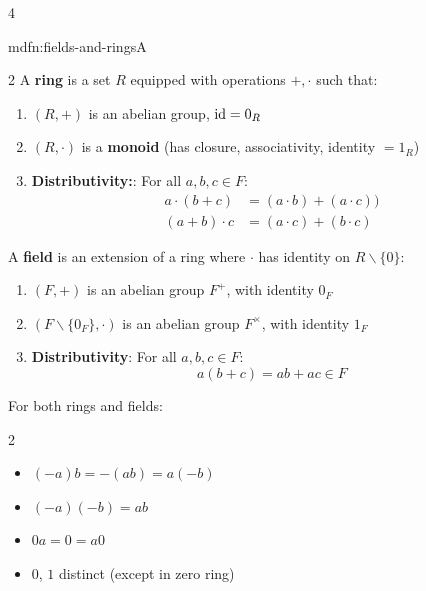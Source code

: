 \documentclass[landscape, 8pt]{extarticle}
\begin{document}
\begin{multicols*}{4}
\begin{mdfn}{mdfn:fields-and-rings}{A}
		{
				\def\columnseprulecolor{\color{black}}
			\setlength{\columnseprule}{0.5pt}
			\begin{multicols}{2}
				\vspace*{-3ex}
				A \textbf{ring} is a set $R$ equipped with operations $+, \cdot$ such that:
				\begin{enumerate}[leftmargin=*]
					\setlength\itemsep{0em}
					\item $(R, +)$ is an abelian group, $\operatorname{id} = 0_R$
					\item $(R, \cdot)$ is a \textbf{monoid} (has closure, associativity, identity $=1_R$)
					\item \textbf{Distributivity:}: For all $a, b, c\in F$:
					\begin{align*}
						a \cdot (b + c) &= (a \cdot b) + (a \cdot c)) \\
						(a + b) \cdot c &= (a \cdot c) + (b \cdot c)
					\end{align*}
				\end{enumerate}
				\columnbreak
				\vspace*{-3ex}
				A \textbf{field} is an extension of a ring where $\cdot$ has identity on $R\backslash\{0\}$:
				\begin{enumerate}[leftmargin=*]
					\setlength\itemsep{0em}
					\item $(F, +)$ is an abelian group $F^{+}$, with identity $0_{F}$
					\item $(F\backslash \{0_{F}\}, \cdot)$ is an abelian group $F^{\times}$, with identity $1_{F}$
					\item \textbf{Distributivity}: For all $a, b, c\in F$:
					\[a(b + c) = ab + ac \in F\]
				\end{enumerate}
			\end{multicols}
		}
			\vspace*{-5ex}
			For both rings and fields:
			\vspace*{-5ex}
			\begin{multicols*}{2}
			\begin{itemize}
				\item $(-a)b = -(ab) = a(-b)$
				\item $(-a)(-b) = ab$
				\item $0a = 0 = a0$
				\item $0$, $1$ distinct (except in zero ring)
			\end{itemize}
			\end{multicols*}
			
			\vspace{-5ex}
			

\end{mdfn}
\end{multicols*}
\end{document}
